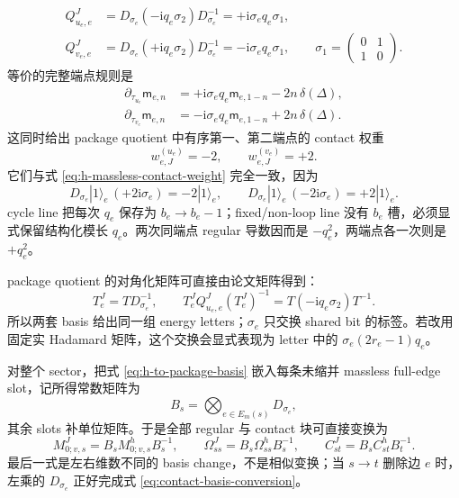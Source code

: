 \documentclass[11pt,a4paper]{ctexart}
\newcommand{\ii}{\mathrm i}
\begin{document}
\begin{align}
 Q^J_{u_e,e}
 &=D_{\sigma_e}(-\ii q_e\sigma_2)D_{\sigma_e}^{-1}
   =+\ii\sigma_eq_e\sigma_1,\\
 Q^J_{v_e,e}
 &=D_{\sigma_e}(+\ii q_e\sigma_2)D_{\sigma_e}^{-1}
   =-\ii\sigma_eq_e\sigma_1,
 \qquad
 \sigma_1=\begin{pmatrix}0&1\\1&0\end{pmatrix}.
 \label{eq:package-endpoint-generators}
\end{align}
等价的完整端点规则是
\begin{align}
 \partial_{\tau_{u_e}}\mathsf m_{e,n}
 &=+\ii\sigma_eq_e\mathsf m_{e,1-n}-2n\,\delta(\Delta),\\
 \partial_{\tau_{v_e}}\mathsf m_{e,n}
 &=-\ii\sigma_eq_e\mathsf m_{e,1-n}+2n\,\delta(\Delta).
 \label{eq:package-massless-time-rules}
\end{align}
这同时给出 package quotient 中有序第一、第二端点的 contact 权重
\begin{equation}
 w_{e,J}^{(u_e)}=-2,
 \qquad
 w_{e,J}^{(v_e)}=+2.
 \label{eq:package-massless-contact-weight}
\end{equation}
它们与式 \eqref{eq:h-massless-contact-weight} 完全一致，因为
\begin{equation}
 D_{\sigma_e}|1\rangle_e\,(+2\ii\sigma_e)=-2|1\rangle_e,
 \qquad
 D_{\sigma_e}|1\rangle_e\,(-2\ii\sigma_e)=+2|1\rangle_e.
 \label{eq:contact-basis-conversion}
\end{equation}
cycle line 把每次 $q_e$ 保存为 $b_e\to b_e-1$；fixed/non-loop line 没有 $b_e$ 槽，必须显式保留结构化模长 $q_e$。两次同端点 regular 导数因而是 $-q_e^2$，两端点各一次则是 $+q_e^2$。

package quotient 的对角化矩阵可直接由论文矩阵得到：
\begin{equation}
 T_e^J=T D_{\sigma_e}^{-1},
 \qquad
 T_e^JQ^J_{u_e,e}(T_e^J)^{-1}
 =T(-\ii q_e\sigma_2)T^{-1}.
 \label{eq:package-diagonalizer}
\end{equation}
所以两套 basis 给出同一组 energy letters；$\sigma_e$ 只交换 shared bit 的标签。若改用固定实 Hadamard 矩阵，这个交换会显式表现为 letter 中的 $\sigma_e(2r_e-1)q_e$。

对整个 sector，把式 \eqref{eq:h-to-package-basis} 嵌入每条未缩并 massless full-edge slot，记所得常数矩阵为
\begin{equation}
 B_s=\bigotimes_{e\in E_m(s)}D_{\sigma_e},
 \label{eq:global-package-basis}
\end{equation}
其余 slots 补单位矩阵。于是全部 regular 与 contact 块可直接变换为
\begin{equation}
 M_{0;v,s}^{J}=B_sM_{0;v,s}^{h}B_s^{-1},
 \qquad
 \Omega_{ss}^{J}=B_s\Omega_{ss}^{h}B_s^{-1},
 \qquad
 C_{st}^{J}=B_sC_{st}^{h}B_t^{-1}.
 \label{eq:global-package-similarity}
\end{equation}
最后一式是左右维数不同的 basis change，不是相似变换；当 $s\to t$ 删除边 $e$ 时，左乘的 $D_{\sigma_e}$ 正好完成式 \eqref{eq:contact-basis-conversion}。
\end{document}

